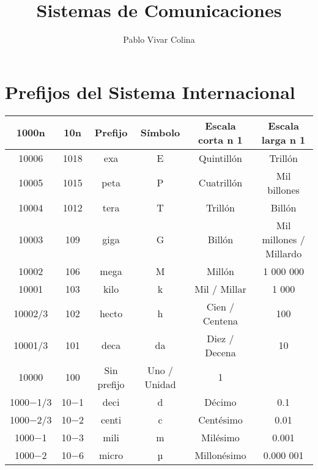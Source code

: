 \documentclass{article}
\title{Sistemas de Comunicaciones}
\author{Pablo Vivar Colina\\


}
\begin{document}
\maketitle

\section{Prefijos del Sistema Internacional}

\begin{table}[h!]
\centering

\begin{tabular}{|c|c|c|c|c|c|}
\hline
1000n    & 10n   & Prefijo     & Símbolo      & Escala corta n 1​ & Escala larga n 1​       \\ \hline
10006    & 1018  & exa         & E            & Quintillón        & Trillón                 \\ \hline
10005    & 1015  & peta        & P            & Cuatrillón        & Mil billones            \\ \hline
10004    & 1012  & tera        & T            & Trillón           & Billón                  \\ \hline
10003    & 109   & giga        & G            & Billón            & Mil millones / Millardo \\ \hline
10002    & 106   & mega        & M            & Millón            & 1 000 000               \\ \hline
10001    & 103   & kilo        & k            & Mil / Millar      & 1 000                   \\ \hline
10002/3  & 102   & hecto       & h            & Cien / Centena    & 100                     \\ \hline
10001/3  & 101   & deca        & da           & Diez / Decena     & 10                      \\ \hline
10000    & 100   & Sin prefijo & Uno / Unidad & 1                 &                         \\ \hline
1000−1/3 & 10−1  & deci        & d            & Décimo            & 0.1                     \\ \hline
1000−2/3 & 10−2  & centi       & c            & Centésimo         & 0.01                    \\ \hline
1000−1   & 10−3  & mili        & m            & Milésimo          & 0.001                   \\ \hline
1000−2   & 10−6  & micro       & µ            & Millonésimo       & 0.000 001               \\ \hline

\end{tabular}
\end{table}
\end{document}
